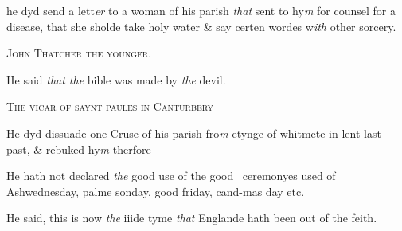 \documentclass[12pt, a4paper]{book}
\begin{document}
		
			
				\marginpar[\vspace{0.5cm}{\textcolor{Gray}{holy water}}]{}
			
			
		\ifthenelse{\isodd{\thepage}}
		{\reversemarginpar}
		{\normalmarginpar}
		he dyd send a lett\textit{er} to a woman of his parish \textit{that} sent to
		 hy\textit{m} for counsel for a disease, that she sholde take holy water
		 \& say certen wordes w\textit{ith} other sorcery.
		
 
	
	
		
				\begin{center} \begin{large} {\scshape \sout{John Thatcher the younger}.} \end{large} \end{center}
			
		
			
		\ifthenelse{\isodd{\thepage}}
		{\reversemarginpar}
		{\normalmarginpar}
		\sout{He said \textit{that the} bible was made by \textit{the} devil.}
		
	
	
		
				\begin{center} \begin{large} {\scshape The vicar of saynt paules in Canturbery} \end{large} \end{center}
			
		
			
				\marginpar[\vspace{0.5cm}{\textcolor{Gray}{lent}}]{}
			
			
		\ifthenelse{\isodd{\thepage}}
		{\reversemarginpar}
		{\normalmarginpar}
		He dyd dissuade one Cruse of his parish fro\textit{m} etynge of
		 whitmete in lent last past, \& rebuked hy\textit{m} therfore
		
		 
		 	
				\marginpar[\vspace{0.5cm}{\textcolor{Gray}{ceremonies}}]{}
			
		 	
		\ifthenelse{\isodd{\thepage}}
		{\reversemarginpar}
		{\normalmarginpar}
		He hath not declared \textit{the} good use of the good  ceremonyes
		 used of Ashwednesday, palme sonday, good friday, cand-mas day etc.
		
			
				\marginpar[\vspace{0.5cm}{\textcolor{Gray}{n}}]{}
			
			
		\ifthenelse{\isodd{\thepage}}
		{\reversemarginpar}
		{\normalmarginpar}
		He said, this is now \textit{the} iiide tyme \textit{that} Englande hath
		 been out of the feith.
		
\end{document}
